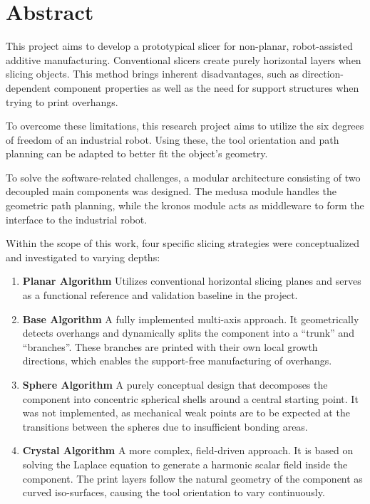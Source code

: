 \chapter*{Abstract}\label{chap:abstract}
{}
\medskip
\noindent

This project aims to develop a prototypical slicer for non-planar, robot-assisted additive manufacturing.
Conventional slicers create purely horizontal layers when slicing objects.
This method brings inherent disadvantages, such as direction-dependent component properties as well as the need for support structures when trying to print overhangs.

To overcome these limitations, this research project aims to utilize the six degrees of freedom of an industrial robot.
Using these, the tool orientation and path planning can be adapted to better fit the object's geometry.

To solve the software-related challenges, a modular architecture consisting of two decoupled main components was designed.
The \acs{medusa} module handles the geometric path planning, while the \acs{kronos} module acts as middleware to form the interface to the industrial robot.

Within the scope of this work, four specific slicing strategies were conceptualized and investigated to varying depths:

\begin{enumerate}
    \item \textbf{Planar Algorithm} Utilizes conventional horizontal slicing planes and serves as a functional reference and validation baseline in the project.
    \item \textbf{Base Algorithm} A fully implemented multi-axis approach.
    It geometrically detects overhangs and dynamically splits the component into a ``trunk'' and ``branches''.
    These branches are printed with their own local growth directions, which enables the support-free manufacturing of overhangs.
    \item \textbf{Sphere Algorithm} A purely conceptual design that decomposes the component into concentric spherical shells around a central starting point.
    It was not implemented, as mechanical weak points are to be expected at the transitions between the spheres due to insufficient bonding areas.
    \item \textbf{Crystal Algorithm} A more complex, field-driven approach.
    It is based on solving the Laplace equation to generate a harmonic scalar field inside the component.
    The print layers follow the natural geometry of the component as curved iso-surfaces, causing the tool orientation to vary continuously.
\end{enumerate}

